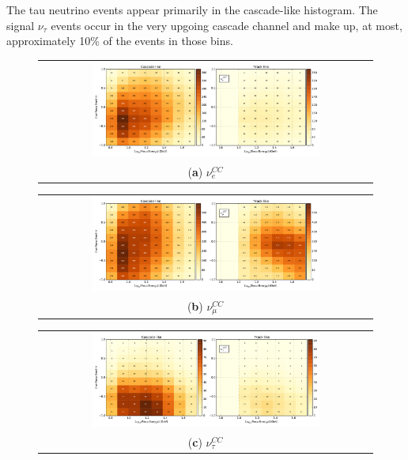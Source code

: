 The tau neutrino events appear primarily in the cascade-like histogram.
The signal $\nu_\tau$ events occur in the very upgoing cascade channel and make up, at most, approximately 10\% of the events in those bins.

\begin{figure}[h]
\centering
\begin{tabular}[b]{c}
  \includegraphics[width=0.7\textwidth]{templates/genie12640(cc).pdf}  \\
  \small (\textbf{\color{ctcolormain}a}) $\nu^{CC}_e$
\end{tabular}
\linebreak
\begin{tabular}[b]{c}
  \includegraphics[width=0.7\textwidth]{templates/genie14640(cc).pdf}  \\
  \small (\textbf{\color{ctcolormain}b})  $\nu^{CC}_\mu$
\end{tabular}
\linebreak
\begin{tabular}[b]{c}
  \includegraphics[width=0.7\textwidth]{templates/genie16640(cc).pdf}  \\
  \small (\textbf{\color{ctcolormain}c})  $\nu^{CC}_\tau$
\end{tabular}
\linebreak
\begin{tabular}[b]{c}

\end{tabular}
\end{figure}
